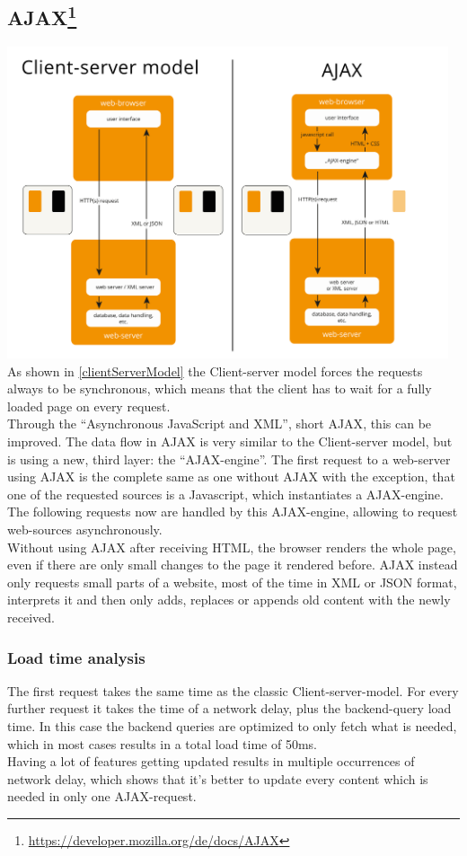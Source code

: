 \documentclass[f,bachelor,binding,twoside,palatino]{WeSTthesis}
\begin{document}
    
  \subsection[AJAX]{\gls{AJAX}\footnote{\url{https://developer.mozilla.org/de/docs/AJAX}}\label{ajax}}
    \includegraphics[width=13cm]{images/client_server_vs_ajax}\\
    As shown in \ref{clientServerModel} the Client-server model forces the requests always to be synchronous, which means that the client has to wait for a fully loaded page on every request.\\
    Through the \enquote{Asynchronous JavaScript and XML}, short \gls{AJAX}, this can be improved.
    The data flow in AJAX is very similar to the Client-server model, but is using a new, third layer: the \enquote{\gls{AJAX}-engine}.
    The first request to a web-server using \gls{AJAX} is the complete same as one without \gls{AJAX} with the exception, that one of the requested sources is a Javascript, which instantiates a \gls{AJAX}-engine.
    The following requests now are handled by this \gls{AJAX}-engine, allowing to request web-sources asynchronously.\\
    Without using \gls{AJAX} after receiving HTML, the browser renders the whole page, even if there are only small changes to the page it rendered before. \gls{AJAX} instead only requests small parts of a website, most of the time in XML or JSON format, interprets it and then only adds, replaces or appends old content with the newly received.
    \subsubsection{Load time analysis}
      The first request takes the same time as the classic Client-server-model.
      For every further request it takes the time of a network delay, plus the backend-query load time.
      In this case the backend queries are optimized to only fetch what is needed, which in most cases results in a total load time of 50ms.\\
      Having a lot of features getting updated results in multiple occurrences of network delay, which shows that it's better to update every content which is needed in only one \gls{AJAX}-request.
    
\end{document}
